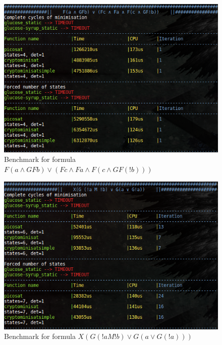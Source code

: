 \begin{figure}[H]
 \centering
 \includegraphics[scale=0.7]{img/satchoose_1.png}
 \caption{Benchmark for formula $F(a \land GFb) \lor (Fc \land Fa \land F(c \land GF(!b)))$}
 \label{fig:satchoose_1}
\end{figure}

\begin{figure}[H]
 \centering
 \includegraphics[scale=0.7]{img/satchoose_2.png}
 \caption{Benchmark for formula $X(G (!a M !b) \lor G(a \lor G(!a)))$}
 \label{fig:satchoose_2}
\end{figure}

